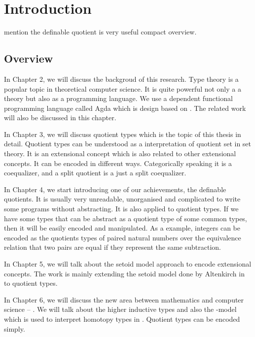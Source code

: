 \chapter{Introduction}






mention the definable quotient is very useful 
compact overview.




\section{Overview}





In Chapter 2, we will discuss the backgroud of this research. Type theory is a popular topic in
theoretical computer science. It is quite powerful not only a a theory
but also as a programming language. We use a dependent functional
programming language called Agda which is design based on \mltt. The
related work will also be discussed in this chapter.


In Chapter 3, we will discuss quotient types which is the topic of
this thesis in detail. Quotient types
can be understood as a interpretation of quotient set in set
theory. It is an extensional concept which is also related to other extensional concepts. It can be encoded in different ways. Categorically speaking it
is a coequalizer, and a split quotient is a just a split coequalizer.


In Chapter 4, we start introducing one of our achievements, the
definable quotients. It is usually very unreadable, unorganised and
complicated to write some programs without abstracting. It is also
applied to quotient types. If we have some types that can be abstract
as a quotient type of some common types, then it will be easily
encoded and manipulated. As a example, integers can be encoded as the
quotients types of paired natural numbers over the equivalence
relation that two pairs are equal if they represent the same
subtraction.


In Chapter 5, we will talk about the setoid model approach to encode
extensional concepts. The work is mainly extending the setoid model
done by Altenkirch in \cite{alti:lics99} to
quotient types.


In Chapter 6, we will discuss the new area between mathematics and
computer science -- \hott. We will talk about the higher inductive
types and also the \wog-model which is used to interpret
homotopy types in \itt. Quotient types can be encoded \hott simply.